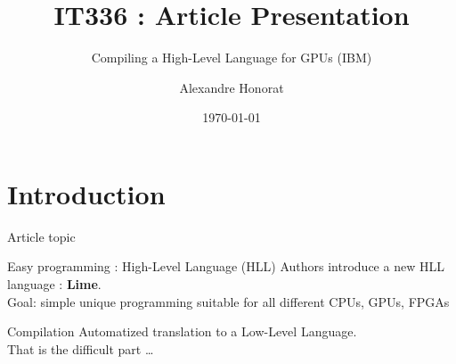 \documentclass[10pt, compress]{beamer}
\title{IT336 : Article Presentation}
\subtitle{Compiling a High-Level Language for GPUs (IBM)}
\date{\today}
\author{Alexandre Honorat}
\institute{Enseirb-Matmeca}
\begin{document}
\maketitle

\section{Introduction}



\begin{frame}{Article topic}
    \begin{block}{Easy programming : High-Level Language (HLL)}
        Authors introduce a new HLL language : \textbf{Lime}.\\
        \alert{Goal:} simple unique programming suitable for all different CPUs, GPUs, FPGAs
    \end{block}
    \begin{block}{Compilation}
        Automatized translation to a Low-Level Language.\\
        That is the difficult part \ldots
    \end{block}
\end{frame}
\end{document}
